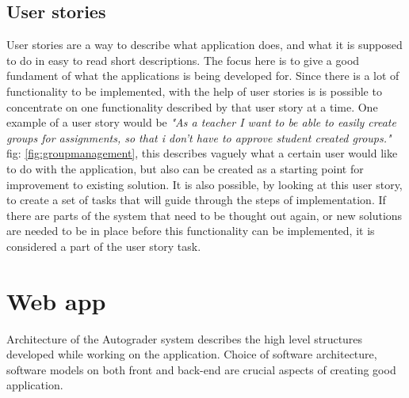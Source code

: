 \subsection{User stories}
User stories are a way to describe what application does, and what it is supposed to do in easy to read short descriptions. The focus here is to give a good fundament of what the applications is being developed for. Since there is a lot of functionality to be implemented, with the help of user stories is is possible to concentrate on one functionality described by that user story at a time. One example of a user story would be \emph{"As a teacher I want to be able to easily create groups for assignments, so that i don't have to approve student created groups."} fig: \ref{fig:groupmanagement},  this describes vaguely what a certain user would like to do with the application, but also can be created as a starting point for improvement to existing solution. It is also possible, by looking at this user story, to create a set of tasks that will guide through the steps of implementation. If there are parts of the system that need to be thought out again, or new solutions are needed to be in place before this functionality can be implemented, it is considered a part of the user story task. 

\section{Web app}
Architecture of the Autograder system describes the high level structures developed while working on the application. Choice of software architecture, software models on both front and back-end are crucial aspects of creating good application.
